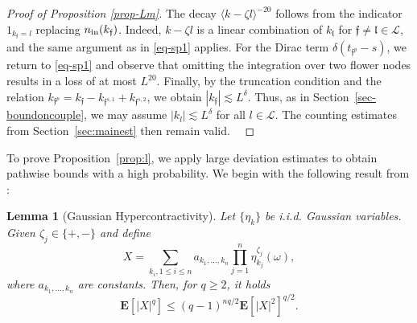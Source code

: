 \documentclass[UTF-8,reqno]{amsart}
\numberwithin{equation}{section}
\newtheorem{lemma}[theorem]{Lemma}
\theoremstyle{definition}
\def\geq{\geqslant}
\def\leq{\leqslant}
\def\geq{\geqslant}
\def\leq{\leqslant}
\begin{document}
\begin{proof}[Proof of Proposition \ref{prop-Lm}]
 The decay $\langle k-\zeta l\rangle^{-20}$ follows from the indicator $1_{k_\mathfrak{f}=l}$ replacing $n_{\rm in}(k_{\mathfrak{f}})$. Indeed, $k-\zeta l$ is a linear combination of $k_{\mathfrak{l}}$ for $\mathfrak{f}\neq \mathfrak{l}\in\mathcal{L}$, and the same argument as in \eqref{eq-sp1} applies. For the Dirac term $\delta(t_{\mathfrak{f}^p}-s)$, we return to \eqref{eq-sp1} and observe that omitting the integration over two flower nodes results in a loss of at most $L^{20}$. Finally, by the truncation condition and the relation
 $k_{\mathfrak{f}^{p}}=k_{\mathfrak{f}}-k_{\mathfrak{f}^{s,1}}+k_{\mathfrak{f}^{s,2}}$, we obtain $|k_\mathfrak{f}|\lesssim L^\delta$. Thus, as in Section~\ref{sec-boundoncouple}, we may assume $|k_l|\lesssim L^\delta$ for all $l\in\mathcal{L}$. The counting estimates from Section~\ref{sec:mainest} then remain valid.
\
\end{proof}


To prove Proposition~\ref{prop:l}, we apply large deviation estimates to obtain pathwise bounds with a high probability. We begin with the following result from \cite[Lemma 6.3]{Wu25}:


\begin{lemma}[Gaussian Hypercontractivity]\label{lem:Gaussian Hypercontractivity}
     Let $\{\eta_k\}$ be i.i.d. Gaussian variables.  Given $\zeta_j\in\{+,-\}$ and define 
 $$X=\sum_{k_i,1\leq i\leq n}a_{k_1,...,k_n}\prod^n_{j=1}\eta^{\zeta_j}_{k_j}(\omega),$$
 where $a_{k_1,...,k_n}$ are constants. Then, for $q\geq2$, it holds
$$ \mathbf{E}[|X|^q]\leq (q-1)^{nq/2}  \mathbf{E}[|X|^2]^{q/2}.$$
\end{lemma}
\end{document}
